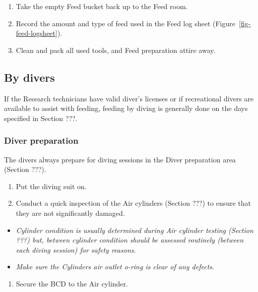 \documentclass[
  letterpaper,
  DIV=11,
  numbers=noendperiod]{scrreprt}
\providecommand{\tightlist}{%
  \setlength{\itemsep}{0pt}\setlength{\parskip}{0pt}}\usepackage{longtable,booktabs,array}
\begin{document}
\begin{enumerate}
\def\labelenumi{\arabic{enumi}.}
\setcounter{enumi}{20}
\tightlist
\item
  Take the empty Feed bucket back up to the Feed room.
\item
  Record the amount and type of feed used in the Feed log sheet
  (Figure~\ref{fig-feed-logsheet}).
\item
  Clean and pack all used tools, and Feed preparation attire away.
\end{enumerate}

\hypertarget{by-divers}{%
\subsection{By divers}\label{by-divers}}

If the Research technicians have valid diver's licenses or if
recreational divers are available to assist with feeding, feeding by
diving is generally done on the days specified in Section ???.

\hypertarget{diver-preparation}{%
\subsubsection{Diver preparation}\label{diver-preparation}}

The divers always prepare for diving sessions in the Diver preparation
area (Section ???).

\begin{enumerate}
\def\labelenumi{\arabic{enumi}.}
\tightlist
\item
  Put the diving suit on.
\item
  Conduct a quick inspection of the Air cylinders (Section ???) to
  ensure that they are not significantly damaged.
\end{enumerate}

\begin{itemize}
\tightlist
\item
  \emph{Cylinder condition is usually determined during Air cylinder
  testing (Section ???) but, between cylinder condition should be
  assessed routinely (between each diving session) for safety reasons}.
\item
  \emph{Make sure the Cylinders air outlet o-ring is clear of any
  defects}.
\end{itemize}

\begin{enumerate}
\def\labelenumi{\arabic{enumi}.}
\setcounter{enumi}{2}
\tightlist
\item
  Secure the BCD to the Air cylinder.
\end{enumerate}
\end{document}
